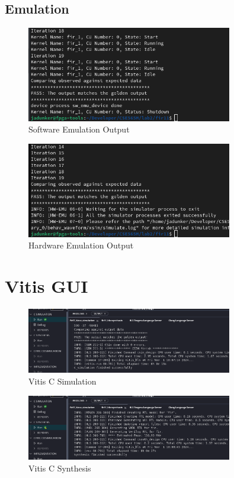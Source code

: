 \documentclass[11pt]{article}
\begin{document}
      \subsection{Emulation}
      \begin{figure}[H]
        \centering
        \includegraphics[width=0.8\textwidth]{opt_sw_emu.png}
        \caption{Software Emulation Output}
        \label{fig:opt_sw_emu_out}
      \end{figure}
      \begin{figure}[H]
        \centering
        \includegraphics[width=0.8\textwidth]{opt_hw_emu.png}
        \caption{Hardware Emulation Output}
        \label{fig:opt_hw_emu_out}
      \end{figure}
    \section{Vitis GUI}
      \begin{figure}[H]
        \centering
        \includegraphics[width=0.8\textwidth]{vitis_c_sim_2.png}
        \caption{Vitis C Simulation}
        \label{fig:vitis_c_sim}
      \end{figure}
      \begin{figure}[H]
        \centering
        \includegraphics[width=0.8\textwidth]{vitis_c_syn.png}
        \caption{Vitis C Synthesis}
        \label{fig:vitis_c_syn}
      \end{figure}
\end{document}
